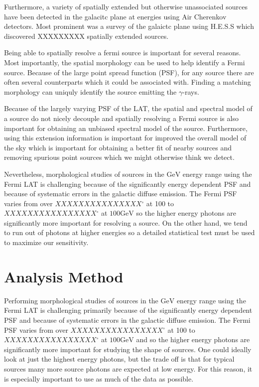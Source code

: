 \documentclass[preprint]{aastex}
\newcommand{\mev}{\text{MeV}\xspace}
\newcommand{\gev}{\text{GeV}\xspace}
\newcommand{\tev}{\text{TeV}\xspace}
\renewcommand{\deg}{\ensuremath{^\circ}\xspace}
\begin{document}
Furthermore, a variety of spatially extended but otherwise unassociated
sources have been detected in the galacitc plane at \tev energies using
Air Cherenkov detectors. Most prominent was a survey of the galaictc
plane using H.E.S.S which discovered XXXXXXXXX spatially extended
sources\cite{HESS_plane_survey}.

Being able to spatially resolve a fermi source is important for several
reasons. Most importantly, the spatial morphology can be used to help
identify a Fermi source. Because of the large point spread function (PSF),
for any source there are often several counterparts which it could be
associated with. Finding a matching morphology can uniquly identify the
source emitting the $\gamma$-rays. 

Because of the largely varying PSF of the LAT, the spatial and spectral
model of a source do not nicely decouple and spatially resolving a Fermi
source is also important for obtaining an unbiased spectral model of
the source.  Furthermore, using this extension information is important
for improved the overall model of the sky which is important for obtaining
a better fit of nearby sources and removing spurious point sources which
we might otherwise think we detect.

Nevertheless, morphological studies of sources in the $\gev$ energy
range using the Fermi LAT is challenging because of the significantly
energy dependent PSF and because of systematic errors in the galactic
diffuse emission. The Fermi PSF varies from over $XXXXXXXXXXXXXXX\deg$
at 100 \mev to $XXXXXXXXXXXXXXXX\deg$ at $100 \gev$ so the higher energy
photons are significantly more important for resolving a source. On
the other hand, we tend to run out of photons at higher energies so a
detailed statistical test must be used to maximize our sensitivity.

\section{Analysis Method}


Performing morphological studies of sources in the $\gev$ energy range using
the Fermi LAT is challenging primarily because of the significantly energy
dependent PSF and because of systematic errors in the
galactic diffuse emission. The Fermi PSF varies from over $XXXXXXXXXXXXXXXX\deg$
at 100 \mev to $XXXXXXXXXXXXXXXX\deg$ at $100 \gev$ and so the higher energy photons are
significantly more important for studying the shape of sources. One could
ideally look at just the highest energy photons, but the trade off is that
for typical sources many more source photons are expected at low energy.
For this reason, it is especially important to use as much of the data
as possible.
\end{document}
